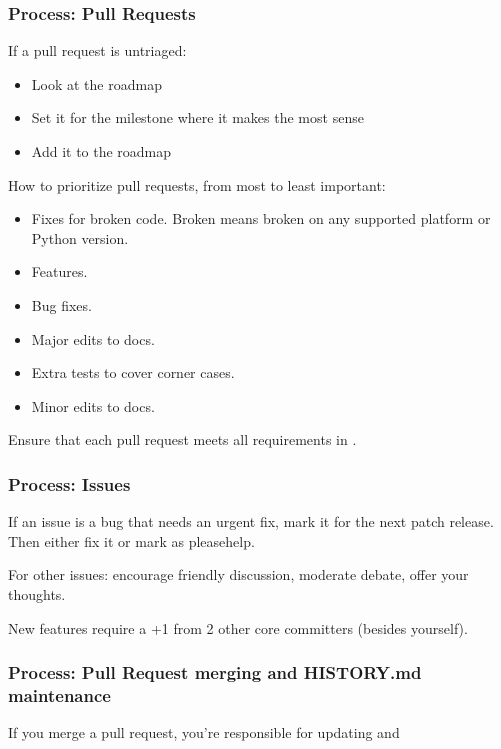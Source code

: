 \documentclass[letterpaper,10pt,english]{sphinxmanual}
\begin{document}
\subsubsection{Process: Pull Requests}
\label{\detokenize{MANIFEST:process-pull-requests}}
If a pull request is untriaged:
\begin{itemize}
\item {} 
Look at the roadmap

\item {} 
Set it for the milestone where it makes the most sense

\item {} 
Add it to the roadmap

\end{itemize}

How to prioritize pull requests, from most to least important:
\begin{itemize}
\item {} 
Fixes for broken code. Broken means broken on any supported platform or Python version.

\item {} 
Features.

\item {} 
Bug fixes.

\item {} 
Major edits to docs.

\item {} 
Extra tests to cover corner cases.

\item {} 
Minor edits to docs.

\end{itemize}

Ensure that each pull request meets all requirements in .


\subsubsection{Process: Issues}
\label{\detokenize{MANIFEST:process-issues}}
If an issue is a bug that needs an urgent fix, mark it for the next patch release.
Then either fix it or mark as please\sphinxhyphen{}help.

For other issues: encourage friendly discussion, moderate debate, offer your thoughts.

New features require a +1 from 2 other core committers (besides yourself).


\subsubsection{Process: Pull Request merging and HISTORY.md maintenance}
\label{\detokenize{MANIFEST:process-pull-request-merging-and-history-md-maintenance}}
If you merge a pull request, you’re responsible for updating  and 
\end{document}
